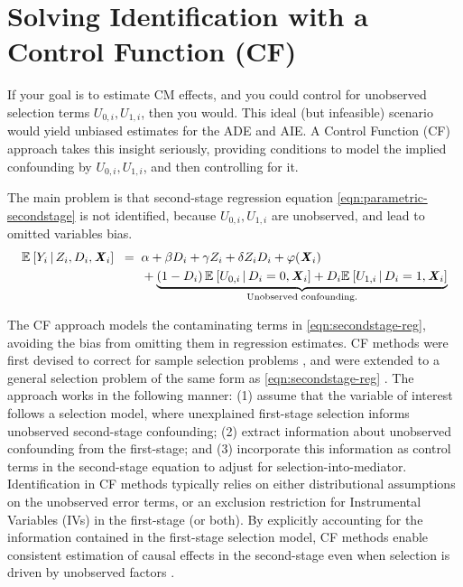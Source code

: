 \section{Solving Identification with a Control Function (CF)}
\label{sec:selectionmodel}
If your goal is to estimate CM effects, and you could control for unobserved selection terms $U_{0,i}, U_{1,i}$, then you would.
This ideal (but infeasible) scenario would yield unbiased estimates for the ADE and AIE.
A Control Function (CF) approach takes this insight seriously, providing conditions to model the implied confounding by $U_{0,i}, U_{1,i}$, and then controlling for it.

The main problem is that second-stage regression equation \eqref{eqn:parametric-secondstage} is not identified, because $U_{0,i},U_{1,i}$ are unobserved, and lead to omitted variables bias.
\begin{align}
    \mathbb{E}_{} \left[ Y_i \, \middle\vert \, Z_i, D_i, \boldsymbol{\mathit{X}}_i \right] \;\; =& \;\;
        \alpha
        + \beta D_i
        + \gamma Z_i
        + \delta Z_i D_i
        + \varphi(\boldsymbol{\mathit{X}}_i) \nonumber \\
        \label{eqn:secondstage-reg}
        & \;\; +\underbrace{\left( 1 - D_i
            \right) \mathbb{E}_{} \left[  U_{0,i}  \, \middle\vert \, D_i = 0, \boldsymbol{\mathit{X}}_i \right]
                + D_i \mathbb{E}_{} \left[  U_{1,i}  \, \middle\vert \, D_i = 1, \boldsymbol{\mathit{X}}_i \right]}_{
                    \text{Unobserved confounding.}}
\end{align}

The CF approach models the contaminating terms in \eqref{eqn:secondstage-reg}, avoiding the bias from omitting them in regression estimates.
CF methods were first devised to correct for sample selection problems \citep{heckman1974shadow}, and were extended to a general selection problem of the same form as \autoref{eqn:secondstage-reg} \citep{heckman1979sample}.
The approach works in the following manner: (1) assume that the variable of interest follows a selection model, where unexplained first-stage selection informs unobserved second-stage confounding; (2) extract information about unobserved confounding from the first-stage; and (3) incorporate this information as control terms in the second-stage equation to adjust for selection-into-mediator.
Identification in CF methods typically relies on either distributional assumptions on the unobserved error terms, or an exclusion restriction for Instrumental Variables (IVs) in the first-stage (or both).
By explicitly accounting for the information contained in the first-stage selection model, CF methods enable consistent estimation of causal effects in the second-stage even when selection is driven by unobserved factors \citep{florens2008identification}.

